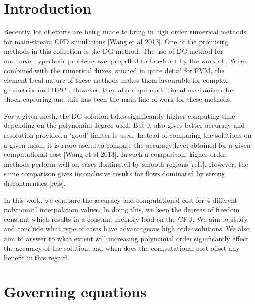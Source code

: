 \documentclass[a4paper,11pt,oneside]{article}
\newcommand{\citear}[1]{\citeauthor{#1} \cite{#1}} %
\begin{document}
\onehalfspacing %
\raggedbottom %

\tableofcontents

\section{Introduction}
\label{sec:intro}

Recently, lot of efforts are being made to bring in high order numerical methods for main-stream CFD simulations [Wang et al 2013]. One of the promising methods in this collection is the DG method. The use of DG method for nonlinear hyperbolic problems was propelled to fore-front by the work of \citear{cockburnShu1998a}. When combined with the numerical fluxes, studied in quite detail for FVM, the element-local nature of these methods makes them favourable for complex geometries and HPC \cite{cockburnShu2001}. However, they also require additional mechanisms for shock capturing and this has been the main line of work for these methods.

For a given mesh, the DG solution takes significantly higher computing time depending on the polynomial degree used. But it also gives better accuracy and resolution provided a `good' limiter is used. Instead of comparing the solutions on a given mesh, it is more useful to compare the accuracy level obtained for a given computational cost [Wang et al 2013]. In such a comparison, higher order methods perform well on cases dominated by smooth regions [refs]. However, the same comparison gives inconclusive results for flows dominated by strong discontinuities [refs].

In this work, we compare the accuracy and computational cost for 4 different polynomial interpolation values. In doing this, we keep the degrees of freedom constant which results in a constant memory load on the CPU. We aim to study and conclude what type of cases have advantageous high order solutions. We also aim to answer to what extent will increasing polynomial order significantly effect the accuracy of the solution, and when does the computational cost offset any benefit in this regard.



\section{Governing equations}
\label{sec:gov-eq}
\end{document}
